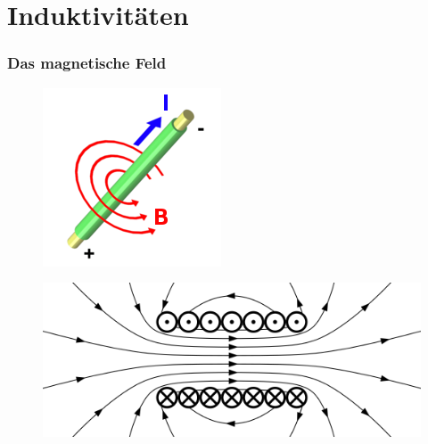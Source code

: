 \section*{Induktivitäten}

\begin{frame}
  \frametitle{Das magnetische Feld}
  \begin{center}
    \begin{minipage}{0.45\textwidth}
      \begin{center}
        \begin{figure}
          \includegraphics[width=\textwidth,height=.3\textheight,keepaspectratio]{e08/RechteHand.png}
        \end{figure}
      \end{center}
    \end{minipage}
    \begin{minipage}{0.45\textwidth}
      \begin{center}
        \begin{figure}
          \includegraphics[width=\textwidth,height=.3\textheight,keepaspectratio]{e06/seopardy2.png}\\

\end{figure}
\end{center}
\end{minipage}
\end{center}
\end{frame}

